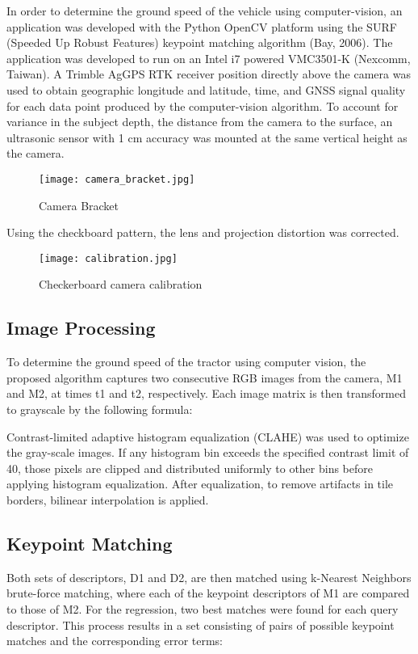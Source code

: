 In order to determine the ground speed of the vehicle using
computer-vision, an application was developed with the Python OpenCV
platform using the SURF (Speeded Up Robust Features) keypoint matching
algorithm (Bay, 2006). The application was developed to run on an
Intel i7 powered VMC3501-K (Nexcomm, Taiwan). A Trimble AgGPS RTK
receiver position directly above the camera was used to obtain
geographic longitude and latitude, time, and GNSS signal quality for
each data point produced by the computer-vision algorithm. To account
for variance in the subject depth, the distance from the camera to the
surface, an ultrasonic sensor with 1 cm accuracy was mounted at the
same vertical height as the camera.

\begin{figure}
  \centering
  \texttt{[image: camera\_bracket.jpg]}
  \caption{Camera Bracket}
  \label{fig:camera_bracket}
\end{figure}

Using the checkboard pattern, the lens and projection distortion was corrected.
\begin{figure}
  \centering
  \texttt{[image: calibration.jpg]}
  \caption{Checkerboard camera calibration}
  \label{fig:calibration}
\end{figure}

\subsection{Image Processing}
To determine the ground speed of the tractor using computer vision,
the proposed algorithm captures two consecutive RGB images from the
camera, M1 and M2, at times t1 and t2, respectively. Each image matrix
is then transformed to grayscale by the following formula:

Contrast-limited adaptive histogram equalization (CLAHE) was used to
optimize the gray-scale images. If any histogram bin exceeds the
specified contrast limit of 40, those pixels are clipped and
distributed uniformly to other bins before applying histogram
equalization. After equalization, to remove artifacts in tile borders,
bilinear interpolation is applied.


\subsection{Keypoint Matching}
Both sets of descriptors, D1 and D2, are then matched using k-Nearest
Neighbors brute-force matching, where each of the keypoint descriptors
of M1 are compared to those of M2. For the regression, two best
matches were found for each query descriptor. This process results in
a set consisting of pairs of possible keypoint matches and the
corresponding error terms:

